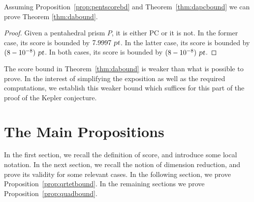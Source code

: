 %

Assuming Proposition~\ref{prop:pentscorebd} and Theorem~\ref{thm:dapcbound} we can prove
Theorem \ref{thm:dabound}.

\begin{proof}
Given a pentahedral prism $P$, it is either PC or it is not.  In the former case,
its score is bounded by $7.9997 \text{ \sl pt}$.  In the latter case, its score is bounded
by $(8 - 10^{-8}) \text{ \sl pt}$.  In both cases, its score is bounded by $(8 - 10^{-8}) \text{ \sl pt}$.
\end{proof}

\begin{remark}
The score  bound in Theorem~\ref{thm:dabound} is weaker than what is possible to prove.  In the interest of simplifying the exposition as well as the required computations, we establish this weaker bound which suffices for this part of the proof of the Kepler conjecture.

\end{remark}

\chapter{The Main Propositions}

In the first section, we recall the definition of score, and introduce some local notation.  In the next section, we recall the notion of dimension reduction, and prove its validity for some relevant cases.
In the following section, we prove Proposition~\ref{prop:qrtetbound}.
In the remaining sections we prove Proposition~\ref{prop:quadbound}.

